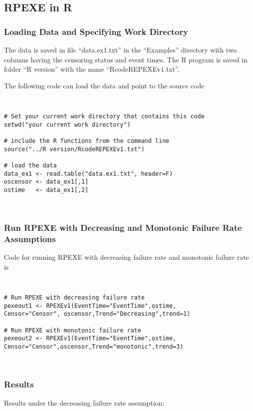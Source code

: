 \documentclass[12pt] {article}
\newenvironment{boxit}{\begin{lrbox}{\savepar}
\begin{minipage}[b]{5.5in}}
{\end{minipage}\end{lrbox}\fbox{\usebox{\savepar}}}
\begin{document}
\subsection{RPEXE in R}
\subsubsection{Loading Data and Specifying Work Directory}
The data is saved in file ``data.ex1.txt'' in the ``Examples'' directory with two columns having the censoring status and event times. The R program is saved in folder ``R version'' with the name ``RcodeREPEXEv1.txt''.

The following code can load the data and point to the source code

\begin{boxit} {\tt
\noindent
\begin{verbatim}
# Set your current work directory that contains this code
setwd("your current work directory")

# include the R functions from the command line
source("../R version/RcodeREPEXEv1.txt")

# load the data
data_ex1 <- read.table("data.ex1.txt", header=F)
oscensor <- data_ex1[,1]
ostime   <- data_ex1[,2]
\end{verbatim}}
\end{boxit} \\

\newpage
\subsubsection{Run RPEXE with Decreasing and Monotonic Failure Rate Assumptions}

Code for running RPEXE with decreasing failure rate and monotonic failure rate is

\begin{boxit} {\tt
\noindent
\begin{verbatim}
# Run RPEXE with decreasing failure rate
pexeout1 <- RPEXEv1(EventTime="EventTime",ostime,
Censor="Censor", oscensor,Trend="Decreasing",trend=1)

# Run RPEXE with monotonic failure rate
pexeout2 <- RPEXEv1(EventTime="EventTime",ostime,
Censor="Censor",oscensor,Trend="monotonic",trend=3)
\end{verbatim}}
\end{boxit} \\


\subsubsection{Results}
Results under the decreasing failure rate assumption:
\end{document}

